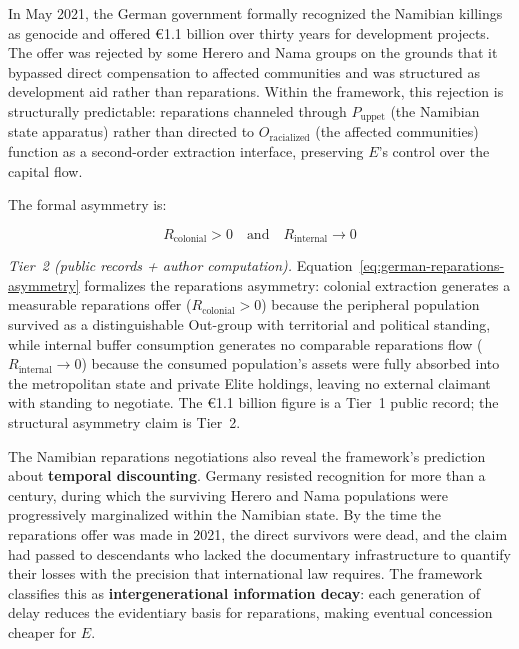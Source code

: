 In May 2021, the German government formally recognized the Namibian killings as genocide and offered €1.1 billion over thirty years for development projects. The offer was rejected by some Herero and Nama groups on the grounds that it bypassed direct compensation to affected communities and was structured as development aid rather than reparations. Within the framework, this rejection is structurally predictable: reparations channeled through $P_{\text{uppet}}$ (the Namibian state apparatus) rather than directed to $O_{\text{racialized}}$ (the affected communities) function as a second-order extraction interface, preserving $E$'s control over the capital flow.

The formal asymmetry is:

\begin{equation}\label{eq:german-reparations-asymmetry}
R_{\text{colonial}} > 0 \quad \text{and} \quad R_{\text{internal}} \rightarrow 0
\end{equation}

\noindent\textit{Tier~2 (public records + author computation).} Equation~\ref{eq:german-reparations-asymmetry} formalizes the reparations asymmetry: colonial extraction generates a measurable reparations offer ($R_{\text{colonial}} > 0$) because the peripheral population survived as a distinguishable Out-group with territorial and political standing, while internal buffer consumption generates no comparable reparations flow ($R_{\text{internal}} \rightarrow 0$) because the consumed population's assets were fully absorbed into the metropolitan state and private Elite holdings, leaving no external claimant with standing to negotiate. The €1.1 billion figure is a Tier~1 public record; the structural asymmetry claim is Tier~2.

The Namibian reparations negotiations also reveal the framework's prediction about \textbf{temporal discounting}. Germany resisted recognition for more than a century, during which the surviving Herero and Nama populations were progressively marginalized within the Namibian state. By the time the reparations offer was made in 2021, the direct survivors were dead, and the claim had passed to descendants who lacked the documentary infrastructure to quantify their losses with the precision that international law requires. The framework classifies this as \textbf{intergenerational information decay}: each generation of delay reduces the evidentiary basis for reparations, making eventual concession cheaper for $E$.

